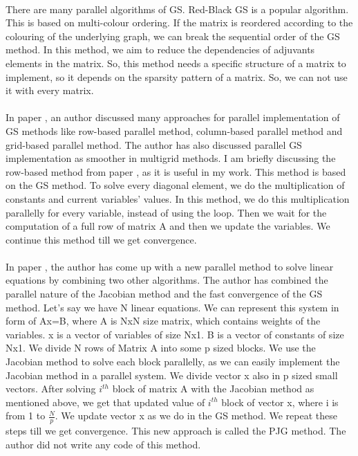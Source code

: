\documentclass[11pt]{article}       %
\begin{document}
\\There are many parallel algorithms of GS. Red-Black GS is a popular algorithm. \cite{rbgs} This is based on multi-colour ordering. If the matrix is reordered according to the colouring of the underlying graph, we can break the sequential order of the GS method. In this method, we aim to reduce the dependencies of adjuvants elements in the matrix. So, this method needs a specific structure of a matrix to implement, so it depends on the sparsity pattern of a matrix. So, we can not use it with every matrix. 
\\
\\In paper \cite{row-based}, an author discussed many approaches for parallel implementation of GS methods like row-based parallel method, column-based parallel method and grid-based parallel method. The author has also discussed parallel GS implementation as smoother in multigrid methods. I am briefly discussing the row-based method from paper \cite{row-based}, as it is useful in my work. This method is based on the GS method. To solve every diagonal element, we do the multiplication of constants and current variables' values. In this method, we do this multiplication parallelly for every variable, instead of using the loop. Then we wait for the computation of a full row of matrix A and then we update the variables. We continue this method till we get convergence.
\\
\\In paper \cite{base-paper}, the author has come up with a new parallel method to solve linear equations by combining two other algorithms. The author has combined the parallel nature of the Jacobian method and the fast convergence of the GS method. Let's say we have N linear equations. We can represent this system in form of Ax=B, where A is  NxN size matrix, which contains weights of the variables. x is a vector of variables of size Nx1. B is a vector of constants of size Nx1. We divide N rows of Matrix A into some p sized blocks. We use the Jacobian method to solve each block parallelly, as we can easily implement the Jacobian method in a parallel system. We divide vector x also in p sized small vectors. After solving $i^{th}$ block of matrix A with the Jacobian method as mentioned above, we get that updated value of $i^{th}$ block of vector x, where i is from 1 to ${\frac{N}{p}}$. We update vector x as we do in the GS method. We repeat these steps till we get convergence. This new approach is called the PJG method. The author did not write any code of this method.
\\
\end{document}
